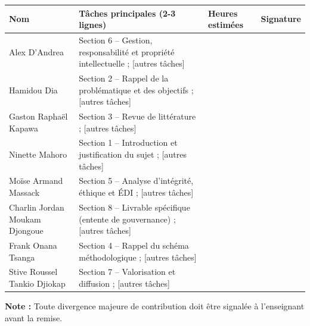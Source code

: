 {\renewcommand{\arraystretch}{1.3}
\noindent\begin{tabularx}{\linewidth}{@{}>{\raggedright\arraybackslash}p{3.5cm}>{\raggedright\arraybackslash}Xp{2cm}p{3.2cm}@{}}
\toprule
\textbf{Nom} & \textbf{Tâches principales (2-3 lignes)} & \textbf{Heures estimées} & \textbf{Signature} \\
\midrule
Alex D'Andrea & Section 6 -- Gestion, responsabilité et propriété intellectuelle ; [autres tâches] & & \\ \midrule
Hamidou Dia & Section 2 -- Rappel de la problématique et des objectifs ; [autres tâches] & & \\ \midrule
Gaston Raphaël Kapawa & Section 3 -- Revue de littérature ; [autres tâches] & & \\ \midrule
Ninette Mahoro & Section 1 -- Introduction et justification du sujet ; [autres tâches] & & \\ \midrule
Moïse Armand Massack & Section 5 -- Analyse d'intégrité, éthique et ÉDI ; [autres tâches] & & \\ \midrule
Charlin Jordan Moukam Djongoue & Section 8 -- Livrable spécifique (entente de gouvernance) ; [autres tâches] & & \\ \midrule
Frank Onana Tsanga & Section 4 -- Rappel du schéma méthodologique ; [autres tâches] & & \\ \midrule
Stive Roussel Tankio Djiokap & Section 7 -- Valorisation et diffusion ; [autres tâches] & & \\
\bottomrule
\end{tabularx}\par}

\medskip
\noindent\textbf{Note :} Toute divergence majeure de contribution doit être signalée à l'enseignant avant la remise.

